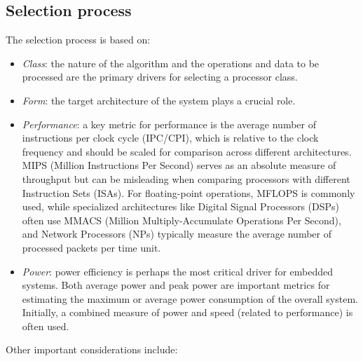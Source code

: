 \subsection{Selection process}
The selection process is based on: 
\begin{itemize}
    \item \textit{Class}: the nature of the algorithm and the operations and data to be processed are the primary drivers for selecting a processor class.
    \item \textit{Form}: the target architecture of the system plays a crucial role. 
    \item \textit{Performance}: a key metric for performance is the average number of instructions per clock cycle (IPC/CPI), which is relative to the clock frequency and should be scaled for comparison across different architectures. 
        MIPS (Million Instructions Per Second) serves as an absolute measure of throughput but can be misleading when comparing processors with different Instruction Sets (ISAs).
        For floating-point operations, MFLOPS is commonly used, while specialized architectures like Digital Signal Processors (DSPs) often use MMACS (Million Multiply-Accumulate Operations Per Second), and Network Processors (NPs) typically measure the average number of processed packets per time unit.
    \item \textit{Power}: power efficiency is perhaps the most critical driver for embedded systems. 
        Both average power and peak power are important metrics for estimating the maximum or average power consumption of the overall system. 
        Initially, a combined measure of power and speed (related to performance) is often used.
\end{itemize}
Other important considerations include:
